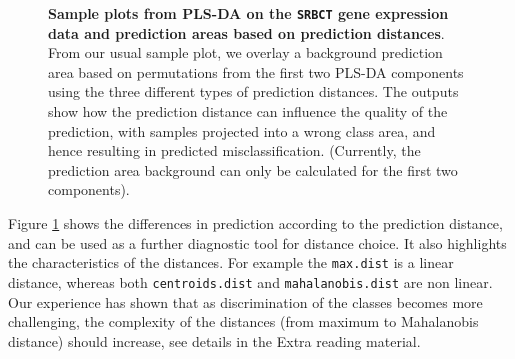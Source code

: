 \documentclass[]{book}
\begin{document}
\begin{figure}

{\centering {}

}

\caption{\textbf{Sample plots from PLS-DA on the \texttt{SRBCT} gene expression data and prediction areas based on prediction distances}. From our usual sample plot, we overlay a background prediction area based on permutations from the first two PLS-DA components using the three different types of prediction distances. The outputs show how the prediction distance can influence the quality of the prediction, with samples projected into a wrong class area, and hence resulting in predicted misclassification. (Currently, the prediction area background can only be calculated for the first two components).}\label{fig:plsda-background}
\end{figure}



Figure \ref{fig:plsda-background} shows the differences in prediction according to the prediction distance, and can be used as a further diagnostic tool for distance choice. It also highlights the characteristics of the distances. For example the \texttt{max.dist} is a linear distance, whereas both \texttt{centroids.dist} and \texttt{mahalanobis.dist} are non linear. Our experience has shown that as discrimination of the classes becomes more challenging, the complexity of the distances (from maximum to Mahalanobis distance) should increase, see details in the Extra reading material.
\end{document}
